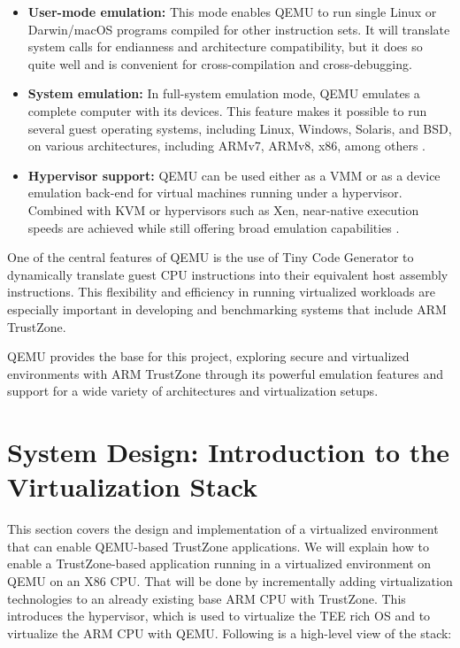 \documentclass[acmtog]{acmart}
\begin{document}
\begin{itemize}
    \item \textbf{User-mode emulation:} This mode enables QEMU to run single Linux or Darwin/macOS programs compiled for other instruction sets. It will translate system calls for endianness and architecture compatibility, but it does so quite well and is convenient for cross-compilation and cross-debugging.
    \item \textbf{System emulation:} In full-system emulation mode, QEMU emulates a complete computer with its devices. This feature makes it possible to run several guest operating systems, including Linux, Windows, Solaris, and BSD, on various architectures, including ARMv7, ARMv8, x86, among others \cite{qemu_fast_portable}.
    \item \textbf{Hypervisor support:} QEMU can be used either as a VMM or as a device emulation back-end for virtual machines running under a hypervisor. Combined with KVM or hypervisors such as Xen, near-native execution speeds are achieved while still offering broad emulation capabilities \cite{partemu}.
\end{itemize}


One of the central features of QEMU is the use of Tiny Code Generator to dynamically translate guest CPU instructions into their equivalent host assembly instructions. This flexibility and efficiency in running virtualized workloads are especially important in developing and benchmarking systems that include ARM TrustZone.

QEMU provides the base for this project, exploring secure and virtualized environments with ARM TrustZone through its powerful emulation features and support for a wide variety of architectures and virtualization setups.


\section{System Design: Introduction to the Virtualization Stack}

This section covers the design and implementation of a virtualized environment that can enable QEMU-based TrustZone applications. We will explain how to enable a TrustZone-based application running in a virtualized environment on QEMU on an X86 CPU. That will be done by incrementally adding virtualization technologies to an already existing base ARM CPU with TrustZone. This introduces the hypervisor, which is used to virtualize the TEE rich OS and to virtualize the ARM CPU with QEMU. Following is a high-level view of the stack:
\end{document}
